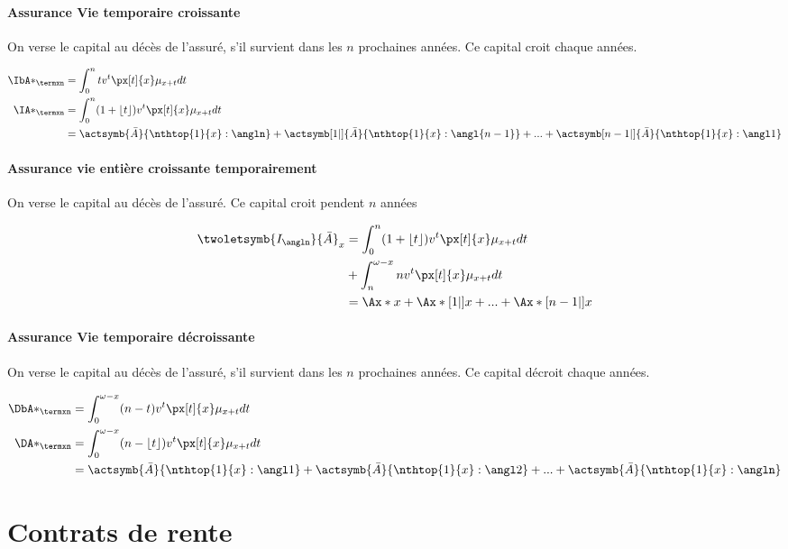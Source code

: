 \documentclass[10pt, french]{article}
\begin{document}
\begin{multicols*}{3}
\paragraph{Assurance Vie temporaire croissante} On verse le capital au décès de l'assuré, s'il survient dans les $n$ prochaines années. Ce capital croit chaque années.

\begin{align*}
	\IbA*_{\termxn} &= \int_0^n t v^t \px[t]{x} \mu_{x+t} dt \\
	\IA*_{\termxn}  &= \int_0^n (1 + \lfloor t \rfloor) v^t \px[t]{x} \mu_{x+t} dt \\
		&= \actsymb{\bar{A}}{\nthtop{1}{x}:\angln} + \actsymb[1|]{\bar{A}}{\nthtop{1}{x}:\angl{n-1}} + ... + \actsymb[n-1|]{\bar{A}}{\nthtop{1}{x}:\angl1}
\end{align*}

\paragraph{Assurance vie entière croissante temporairement} On verse le capital au décès de l'assuré. Ce capital croit pendent $n$ années

\begin{align*}
	\twoletsymb{I_{\angln}}{\bar{A}}_{x}  &= \int_0^n (1 + \lfloor t \rfloor) v^t \px[t]{x} \mu_{x+t} dt \\
	& + \int_n^{\omega - x} n v^t \px[t]{x} \mu_{x+t} dt \\
		&= \Ax*{x} + \Ax*[1|]{x} + ... + \Ax*[n-1|]{x}
\end{align*}

\paragraph{Assurance Vie temporaire décroissante} On verse le capital au décès de l'assuré, s'il survient dans les $n$ prochaines années. Ce capital décroit chaque années.

\begin{align*}
	\DbA*_{\termxn} &= \int_0^{\omega - x} (n - t) v^t \px[t]{x} \mu_{x+t} dt \\
	\DA*_{\termxn}  &= \int_0^{\omega - x} (n - \lfloor t \rfloor) v^t \px[t]{x} \mu_{x+t} dt \\
		&= \actsymb{\bar{A}}{\nthtop{1}{x}:\angl1} + \actsymb{\bar{A}}{\nthtop{1}{x}:\angl2} + ... + \actsymb{\bar{A}}{\nthtop{1}{x}:\angln}
\end{align*}

\section{Contrats de rente}

\end{multicols*}
\end{document}

